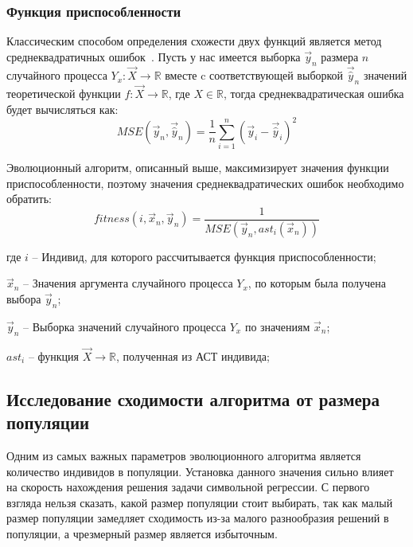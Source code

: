 \clearpage
\subsubsection{Функция приспособленности}

Классическим способом определения схожести двух функций является метод среднеквадратичных ошибок~\cite{MeanSquareError}. Пусть у нас имеется выборка $\vec{y}_n$ размера $n$ случайного процесса $Y_x : \vec{X} \rightarrow \mathbb{R}$ вместе c соответствующей выборкой $\vec{\hat{y}}_n$ значений теоретической функции $f : \vec{X} \rightarrow \mathbb{R}$, где $X \in \mathbb{R}$, тогда среднеквадратическая ошибка будет вычисляться как:
\begin{equation}
\label{equation:meanError}
MSE(\vec{y}_n, \vec{\hat{y}}_n) = \frac{1}{n} \sum_{i=1}^{n} (\vec{y}_i - \vec{\hat{y}}_i)^2
\end{equation}

Эволюционный алгоритм, описанный выше, максимизирует значения функции приспособленности, поэтому значения среднеквадратических ошибок необходимо обратить:
\begin{equation}
fitness(i, \vec{x}_n, \vec{y}_n) = \frac{1}{MSE(\vec{y}_n, ast_i(\vec{x}_n))}
\end{equation}
\begin{ESKDExplanation}
\item[где ] $i$ -- Индивид, для которого рассчитывается функция приспособленности;
\item       $\vec{x}_n$ -- Значения аргумента случайного процесса $Y_x$, по которым была получена выбора $\vec{y}_n$;
\item       $\vec{y}_n$ -- Выборка значений случайного процесса $Y_x$ по значениям $\vec{x}_n$;
\item       $ast_i$ -- функция $\vec{X} \rightarrow \mathbb{R}$, полученная из АСТ индивида;
\end{ESKDExplanation}

\clearpage
\subsection{Исследование сходимости алгоритма от размера популяции}

Одним из самых важных параметров эволюционного алгоритма является количество индивидов в популяции. Установка данного значения сильно влияет на скорость нахождения решения задачи символьной регрессии. С первого взгляда нельзя сказать, какой размер популяции стоит выбирать, так как малый размер популяции замедляет сходимость из-за малого разнообразия решений в популяции, а чрезмерный размер является избыточным. 

